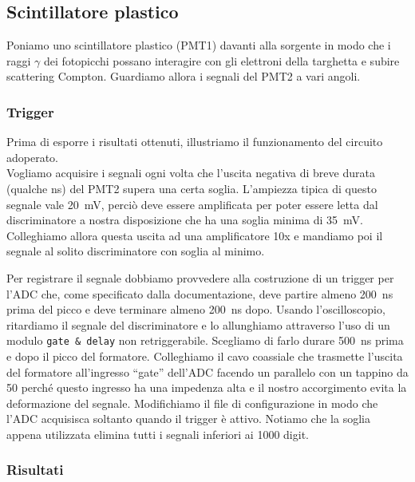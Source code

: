 
\subsection{Scintillatore plastico}

Poniamo uno scintillatore plastico (PMT1) davanti alla sorgente in modo che i raggi $\gamma$ dei fotopicchi possano interagire con gli elettroni della targhetta e subire scattering Compton. Guardiamo allora i segnali del PMT2 a vari angoli.


\subsubsection{Trigger}

Prima di esporre i risultati ottenuti, illustriamo il funzionamento del circuito adoperato.\\
Vogliamo acquisire i segnali ogni volta che l'uscita negativa di breve durata (qualche \si{ns}) del PMT2 supera una certa soglia. L'ampiezza tipica di questo segnale vale \SI{20}{mV}, perciò deve essere amplificata per poter essere letta dal discriminatore a nostra disposizione che ha una soglia minima di \SI{35}{mV}. Colleghiamo allora questa uscita ad una amplificatore 10x 
e mandiamo poi il segnale al solito discriminatore con soglia al minimo.

Per registrare il segnale dobbiamo provvedere alla costruzione di un trigger per l'ADC che, come specificato dalla documentazione, deve partire almeno \SI{200}{ns} prima del picco e deve terminare almeno \SI{200}{ns} dopo. Usando l'oscilloscopio, ritardiamo il segnale del discriminatore e lo allunghiamo attraverso l'uso di un modulo \texttt{gate \& delay} non retriggerabile. Scegliamo di farlo durare \SI{500}{ns} prima e dopo il picco del formatore.
Colleghiamo il cavo coassiale che trasmette l'uscita del formatore all'ingresso ``gate'' dell'ADC facendo un parallelo con un tappino da \SI{50}{\Omega} perché questo ingresso ha una impedenza alta e il nostro accorgimento evita la deformazione del segnale.
Modifichiamo il file di configurazione in modo che l'ADC acquisisca soltanto quando il trigger è attivo. Notiamo che la soglia appena utilizzata elimina tutti i segnali inferiori ai 1000 digit. 

\subsubsection{Risultati} %
